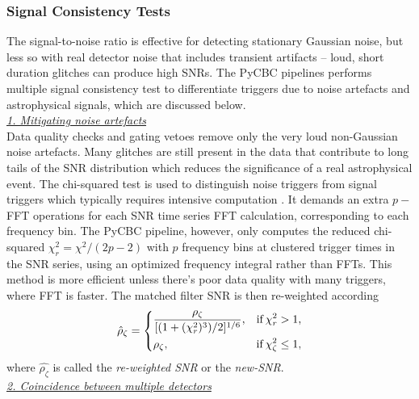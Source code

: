 \subsubsection{Signal Consistency Tests}
The signal-to-noise ratio is effective for detecting stationary Gaussian noise, but less so with real detector noise that includes transient artifacts -- loud, short duration glitches can produce high SNRs. The PyCBC pipelines performs multiple signal consistency test to differentiate triggers due to noise artefacts and astrophysical signals, which are discussed below.\\

\noindent\underline{\textit{1. Mitigating noise artefacts}}\\

Data quality checks and gating vetoes remove only the very loud non-Gaussian noise artefacts. Many glitches are still present in the data that contribute to long tails of the SNR distribution which reduces the significance of a real astrophysical event. The chi-squared test is used to distinguish noise triggers from signal triggers which typically requires intensive computation \cite{Allen:2004gu}. It demands an extra $p-$ FFT operations for each SNR time series FFT calculation, corresponding to each frequency bin. The PyCBC pipeline, however, only computes the reduced chi-squared $\chi^2_r = \chi^2/(2p-2)$ with $p$ frequency bins at clustered trigger times in the SNR series, using an optimized frequency integral rather than FFTs. This method is more efficient unless there's poor data quality with many triggers, where FFT is faster. The matched filter SNR is then re-weighted according 
\begin{align}
    \hat{\rho}_{\zeta} = \left\{
    \begin{aligned}
        &\dfrac{\rho_{\zeta}}{[(1+(\chi_r^2)^3)/2]^{1/6}},  &\text{if}\hspace{0.2em}  \chi_{r}^2 > 1, \\
        & \rho_{\zeta}, & \text{if} \hspace{0.2em} \chi_{\zeta}^2 \leq 1,
    \end{aligned}
    \right.
\end{align}
where $\hat{\rho_{\zeta}}$ is called the \textit{re-weighted SNR} or the \textit{new-SNR}.\\

\noindent\underline{\textit{2. Coincidence between multiple detectors}}\\

